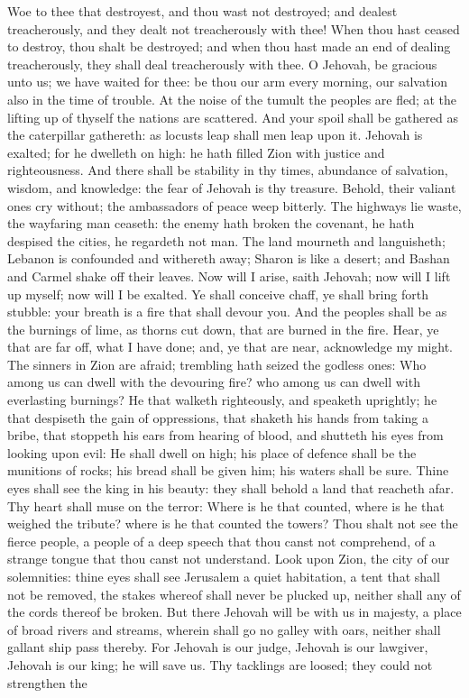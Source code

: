 Woe to thee that destroyest, and thou wast not destroyed; and dealest treacherously, and they dealt not treacherously with thee! When thou hast ceased to destroy, thou shalt be destroyed; and when thou hast made an end of dealing treacherously, they shall deal treacherously with thee. O Jehovah, be gracious unto us; we have waited for thee: be thou our arm every morning, our salvation also in the time of trouble. At the noise of the tumult the peoples are fled; at the lifting up of thyself the nations are scattered. And your spoil shall be gathered as the caterpillar gathereth: as locusts leap shall men leap upon it. Jehovah is exalted; for he dwelleth on high: he hath filled Zion with justice and righteousness. And there shall be stability in thy times, abundance of salvation, wisdom, and knowledge: the fear of Jehovah is thy treasure.  Behold, their valiant ones cry without; the ambassadors of peace weep bitterly. The highways lie waste, the wayfaring man ceaseth: the enemy hath broken the covenant, he hath despised the cities, he regardeth not man. The land mourneth and languisheth; Lebanon is confounded and withereth away; Sharon is like a desert; and Bashan and Carmel shake off their leaves. Now will I arise, saith Jehovah; now will I lift up myself; now will I be exalted. Ye shall conceive chaff, ye shall bring forth stubble: your breath is a fire that shall devour you. And the peoples shall be as the burnings of lime, as thorns cut down, that are burned in the fire.  Hear, ye that are far off, what I have done; and, ye that are near, acknowledge my might. The sinners in Zion are afraid; trembling hath seized the godless ones: Who among us can dwell with the devouring fire? who among us can dwell with everlasting burnings? He that walketh righteously, and speaketh uprightly; he that despiseth the gain of oppressions, that shaketh his hands from taking a bribe, that stoppeth his ears from hearing of blood, and shutteth his eyes from looking upon evil: He shall dwell on high; his place of defence shall be the munitions of rocks; his bread shall be given him; his waters shall be sure.  Thine eyes shall see the king in his beauty: they shall behold a land that reacheth afar. Thy heart shall muse on the terror: Where is he that counted, where is he that weighed the tribute? where is he that counted the towers? Thou shalt not see the fierce people, a people of a deep speech that thou canst not comprehend, of a strange tongue that thou canst not understand. Look upon Zion, the city of our solemnities: thine eyes shall see Jerusalem a quiet habitation, a tent that shall not be removed, the stakes whereof shall never be plucked up, neither shall any of the cords thereof be broken. But there Jehovah will be with us in majesty, a place of broad rivers and streams, wherein shall go no galley with oars, neither shall gallant ship pass thereby. For Jehovah is our judge, Jehovah is our lawgiver, Jehovah is our king; he will save us. Thy tacklings are loosed; they could not strengthen the 